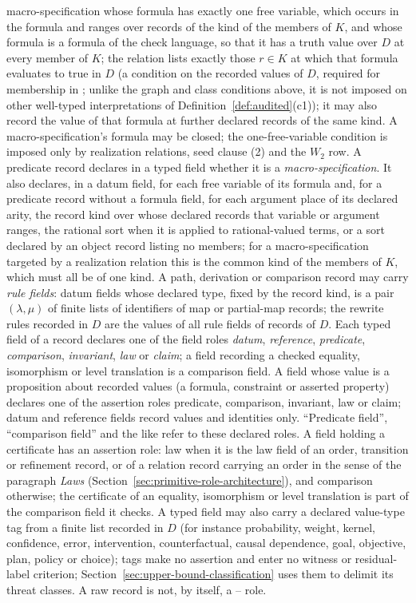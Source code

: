 \begin{definition}
macro-specification whose formula has exactly one free variable, which occurs in the formula and
ranges over records of the kind of the members of \(K\), and whose formula is a formula of the check language, so that it has a truth value over \(D\) at every member of \(K\); the relation lists
exactly those \(r\in K\) at which that formula evaluates to true in \(D\) (a condition on the recorded values of \(D\), required for membership in \FATCD{}; unlike the graph and class conditions above, it is not imposed on other well-typed interpretations of Definition~\ref{def:audited}(c1)); it may also record the value of that formula at further declared records
of the same kind. A macro-specification's formula may be closed; the
one-free-variable condition is imposed only by realization relations, seed
clause (2) and the \(W_2\) row. A predicate record declares in a
typed field whether it is a \emph{macro-specification}. It also declares, in a datum field, for each free variable of its formula and, for a predicate record without a formula field, for each argument place of its declared arity, the record kind over whose declared records that variable or argument ranges, the rational sort when it is applied to rational-valued terms, or a sort declared by an object record listing no members; for a macro-specification targeted by a realization relation this is the common kind of the members of \(K\), which must all be of one kind. A path, derivation or comparison
record may carry \emph{rule fields}: datum fields whose declared type, fixed by
the record kind, is a pair \((\lambda,\mu)\) of finite lists of identifiers of map
or partial-map records; the rewrite rules recorded in \(D\) are the values of
all rule fields of records of \(D\). Each typed field of a
record declares one of the field roles \emph{datum}, \emph{reference},
\emph{predicate}, \emph{comparison}, \emph{invariant}, \emph{law} or
\emph{claim}; a field recording a checked equality, isomorphism or level
translation is a comparison field. A field whose value is a proposition about
recorded values (a formula, constraint or asserted property) declares one of
the assertion roles predicate, comparison, invariant, law or claim; datum and
reference fields record values and identities only. ``Predicate field'', ``comparison field''
and the like refer to these declared roles. A field holding a certificate has
an assertion role: law when it is the law field of an order, transition or
refinement record, or of a relation record carrying an order in the sense of
the paragraph \emph{Laws} (Section~\ref{sec:primitive-role-architecture}), and
comparison otherwise; the certificate of an equality,
isomorphism or level translation is part of the comparison field it checks. A typed field may also carry a
declared value-type tag from a finite list recorded in \(D\) (for instance
probability, weight, kernel, confidence, error, intervention, counterfactual,
causal dependence, goal, objective, plan, policy or choice); tags make no
assertion and enter no witness or residual-label criterion;
Section~\ref{sec:upper-bound-classification} uses them to delimit its threat
classes. A raw record is not, by itself, a
\Pone{}--\Psix{} role.
\end{definition}

